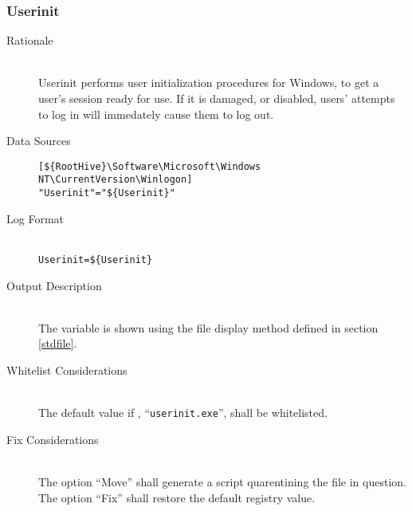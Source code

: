 \subsubsection{Userinit}
\begin{description}
\item[Rationale] \hfill \\
Userinit performs user initialization procedures for Windows, to get a user's
session ready for use. If it is damaged, or disabled, users' attempts to log in
will immedately cause them to log out.
\item[Data Sources] \hfill
\vspace{-\baselineskip}
\begin{verbatim}
[${RootHive}\Software\Microsoft\Windows NT\CurrentVersion\Winlogon]
"Userinit"="${Userinit}"
\end{verbatim}
\item[Log Format] \hfill \\
\verb|Userinit=${Userinit}|
\item[Output Description] \hfill \\
The variable  is shown using the file display method defined in
section \ref{stdfile}.
\item[Whitelist Considerations] \hfill \\
The default value if , ``\verb|userinit.exe|'', shall be whitelisted.
\item[Fix Considerations] \hfill \\
The option ``Move'' shall generate a script quarentining the file in question.
The option ``Fix'' shall restore the default registry value.
\end{description}

